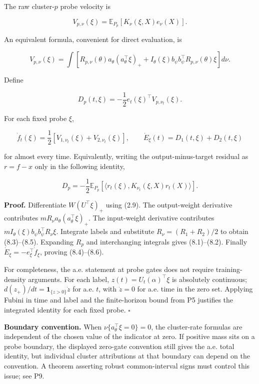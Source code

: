 \documentclass[
  10pt,
]{article}
\begin{document}
The raw cluster-\(p\) probe velocity is

\[
 V_{p,\nu}(\xi)=\mathbb E_{P_p}[K_\nu(\xi,X)e_\nu(X)].
 \tag{8.2}
\]

An equivalent formula, convenient for direct evaluation, is

\[
 V_{p,\nu}(\xi)=\int\left[
 R_{p,\nu}(\theta)a_\theta(a_\theta^\top\xi)_+
 +I_\theta(\xi)b_\psi b_\psi^\top R_{p,\nu}(\theta)\xi
 \right]d\nu.
 \tag{8.3}
\]

Define

\[
 \boxed{D_p(t,\xi)=-\frac12e_t(\xi)^\top V_{p,\nu_t}(\xi).}
 \tag{8.4}
\]

For each fixed probe \(\xi\),

\[
 \dot f_t(\xi)=\frac12[V_{1,\nu_t}(\xi)+V_{2,\nu_t}(\xi)],\qquad
 \boxed{\dot E_\xi(t)=D_1(t,\xi)+D_2(t,\xi)}
 \tag{8.5}
\]

for almost every time. Equivalently, writing the output-minus-target
residual as \(r=f-x\) only in the following identity,

\[
 D_p=-\frac12\mathbb E_{P_p}
 [\langle r_t(\xi),K_{\nu_t}(\xi,X)r_t(X)\rangle].
 \tag{8.6}
\]

\textbf{Proof.} Differentiate \(W(U^\top\xi)_+\) using (2.9). The
output-weight derivative contributes
\(m R_\nu a_\theta(a_\theta^\top\xi)_+\). The input-weight derivative
contributes \(mI_\theta(\xi)b_\psi b_\psi^\top R_\nu\xi\). Integrate
labels and substitute \(R_\nu=(R_1+R_2)/2\) to obtain (8.3)--(8.5).
Expanding \(R_p\) and interchanging integrals gives (8.1)--(8.2).
Finally \(\dot E_\xi=-e_\xi^\top\dot f_\xi\), proving (8.4)--(8.6).

For completeness, the a.e. statement at probe gates does not require
training-density arguments. For each label, \(z(t)=U_t(\alpha)^\top\xi\)
is absolutely continuous; \(d(z_+)/dt=\mathbf1_{\{z>0\}}\dot z\) for
a.e. \(t\), with \(\dot z=0\) for a.e. time in the zero set. Applying
Fubini in time and label and the finite-horizon bound from P5 justifies
the integrated identity for each fixed probe. \(\square\)

\textbf{Boundary convention.} When \(\nu\{a_\theta^\top\xi=0\}=0\), the
cluster-rate formulas are independent of the chosen value of the
indicator at zero. If positive mass sits on a probe boundary, the
displayed zero-gate convention still gives the a.e. total identity, but
individual cluster attributions at that boundary can depend on the
convention. A theorem asserting robust common-interval signs must
control this issue; see P9.
\end{document}
